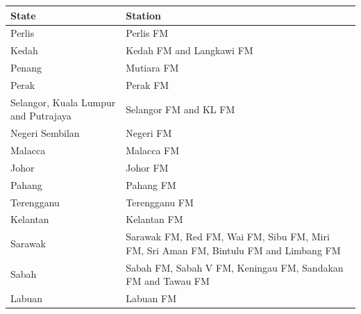\documentclass{article}
\begin{document}
\begin{tabular}{ll}
\toprule
State & Station \\
\midrule
Perlis & Perlis FM \\
Kedah & Kedah FM and Langkawi FM \\
Penang & Mutiara FM \\
Perak & Perak FM \\
Selangor, Kuala Lumpur and Putrajaya & Selangor FM and KL FM \\
Negeri Sembilan & Negeri FM \\
Malacca & Malacca FM \\
Johor & Johor FM \\
Pahang & Pahang FM \\
Terengganu & Terengganu FM \\
Kelantan & Kelantan FM \\
Sarawak & Sarawak FM, Red FM, Wai FM, Sibu FM, Miri FM, Sri Aman FM, Bintulu FM and Limbang FM \\
Sabah & Sabah FM, Sabah V FM, Keningau FM, Sandakan FM and Tawau FM \\
Labuan & Labuan FM \\
\bottomrule
\end{tabular}
\end{document}
